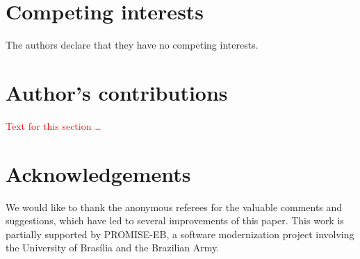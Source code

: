 \documentclass[twocolumn]{bmcart}%
\begin{document}
\begin{backmatter}

\section{Competing interests}
  The authors declare that they have no competing interests.

\section{Author's contributions}
   \textcolor{red}{ Text for this section \ldots}

\section{Acknowledgements}
We would like to thank the anonymous referees for the valuable comments and suggestions, which have led to several improvements of this paper. This work is partially supported by \textsc{PROMISE-EB}, a software modernization project involving the University of Bras\'{i}lia and the Brazilian Army.
  
  
  




\end{backmatter}
\end{document}
